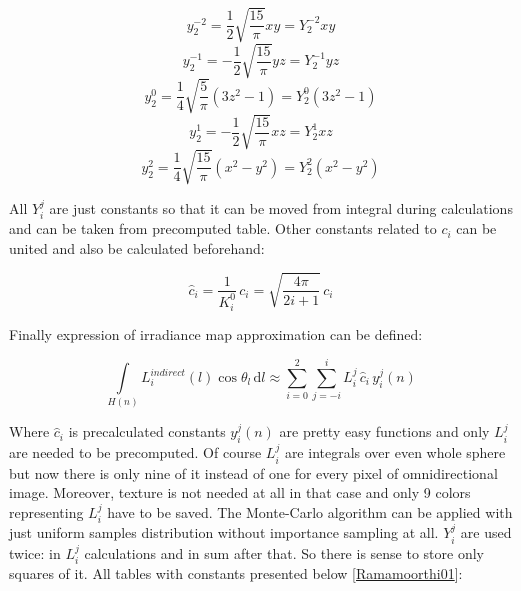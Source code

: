 \[y_2^{-2} = \frac{1}{2}\sqrt{\frac{15}{\pi}}xy = Y_2^{-2}xy\] \[y_2^{-1} = -\frac{1}{2}\sqrt{\frac{15}{\pi}}yz = Y_2^{-1}yz\] \[y_2^0 = \frac{1}{4}\sqrt{\frac{5}{\pi}}(3z^2-1) = Y_2^0(3z^2-1)\] \[y_2^1 = -\frac{1}{2}\sqrt{\frac{15}{\pi}}xz = Y_2^1xz\] \[y_2^2 = \frac{1}{4}\sqrt{\frac{15}{\pi}}(x^2-y^2) = Y_2^2(x^2-y^2)\]

All $Y_i^j$ are just constants so that it can be moved from integral during calculations and can be taken from precomputed table. Other constants related to $c_i$ can be united and also be calculated beforehand\+:

\[\hat{c}_i = \frac{1}{K_i^0}\, c_i = \sqrt{\frac{4\pi}{2i+1}}\, c_i\]

Finally expression of irradiance map approximation can be defined\+:

\[\int\limits_{H(n)} L_i^{indirect}(l) \cos\theta_l\, \mathrm{d}l \approx \sum_{i=0}^2 \sum_{j=-i}^i L_i^j\, \hat{c}_i\, y_i^j(n)\]

Where $\hat{c}_i$ is precalculated constants $y_i^j(n)$ are pretty easy functions and only $L_i^j$ are needed to be precomputed. Of course $L_i^j$ are integrals over even whole sphere but now there is only nine of it instead of one for every pixel of omnidirectional image. Moreover, texture is not needed at all in that case and only 9 colors representing $L_i^j$ have to be saved. The Monte-\/\+Carlo algorithm can be applied with just uniform samples distribution without importance sampling at all. $Y_i^j$ are used twice\+: in $L_i^j$ calculations and in sum after that. So there is sense to store only squares of it. All tables with constants presented below \mbox{[}\hyperlink{specification__pbr_math_Ramamoorthi01}{Ramamoorthi01}\mbox{]}\+:


